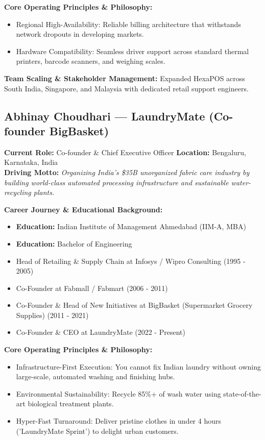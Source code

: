 \documentclass[11pt,a4paper]{article}
\begin{document}
\textbf{Core Operating Principles \& Philosophy:}
\begin{itemize}[leftmargin=*]
    \item Regional High-Availability: Reliable billing architecture that withstands network dropouts in developing markets.
    \item Hardware Compatibility: Seamless driver support across standard thermal printers, barcode scanners, and weighing scales.
\end{itemize}

\textbf{Team Scaling \& Stakeholder Management:} Expanded HexaPOS across South India, Singapore, and Malaysia with dedicated retail support engineers.

\subsection{Abhinay Choudhari --- LaundryMate (Co-founder BigBasket)}
\textbf{Current Role:} Co-founder \& Chief Executive Officer \quad \textbf{Location:} Bengaluru, Karnataka, India\\
\textbf{Driving Motto:} \textit{Organizing India's \$35B unorganized fabric care industry by building world-class automated processing infrastructure and sustainable water-recycling plants.}

\textbf{Career Journey \& Educational Background:}
\begin{itemize}[leftmargin=*]
    \item \textbf{Education:} Indian Institute of Management Ahmedabad (IIM-A, MBA)
    \item \textbf{Education:} Bachelor of Engineering
    \item Head of Retailing \& Supply Chain at Infosys / Wipro Consulting (1995 - 2005)
    \item Co-Founder at Fabmall / Fabmart (2006 - 2011)
    \item Co-Founder \& Head of New Initiatives at BigBasket (Supermarket Grocery Supplies) (2011 - 2021)
    \item Co-Founder \& CEO at LaundryMate (2022 - Present)
\end{itemize}

\textbf{Core Operating Principles \& Philosophy:}
\begin{itemize}[leftmargin=*]
    \item Infrastructure-First Execution: You cannot fix Indian laundry without owning large-scale, automated washing and finishing hubs.
    \item Environmental Sustainability: Recycle 85\%+ of wash water using state-of-the-art biological treatment plants.
    \item Hyper-Fast Turnaround: Deliver pristine clothes in under 4 hours ('LaundryMate Sprint') to delight urban customers.
\end{itemize}
\end{document}
